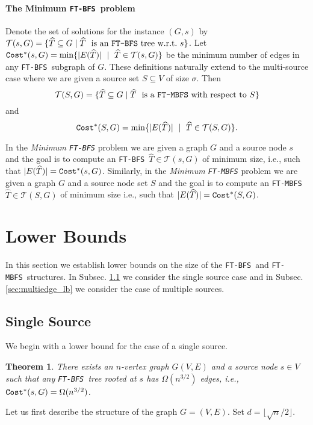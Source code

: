 \documentclass[12pt]{article}
\newtheorem{theorem}{Theorem}[section]
\def\Cost{\mbox{\tt Cost}}
\def\Proof{\par\noindent{\bf Proof:~}}
\def\NSource{\sigma}
\def\FTMBFS{\mbox{\tt FT-MBFS}}
\def\FTBFS{\mbox{\tt FT-BFS}}
\begin{document}
\paragraph{The Minimum \FTBFS\ problem}
Denote the set of solutions for the instance $(G,s)$ by
$\mathcal{T}(s,G)=\{\widehat{T} \subseteq G \mid \widehat{T} \mbox{~~is an \FTBFS\ tree w.r.t.~} s\}$.
Let $\Cost^*(s, G)=\min\{|E(\widehat{T})| ~\mid~\widehat{T} \in \mathcal{T}(s,G)\}$
be the minimum number of edges in any \FTBFS\ subgraph of $G$.
These definitions naturally extend to the multi-source case where we are
given a source set $S \subseteq V$ of size $\NSource$.
Then $$\mathcal{T}(S,G)=\{\widehat{T} \subseteq G \mid \widehat{T} \mbox{~~is a
\FTMBFS\ with respect to~} S\}$$
and $$\Cost^*(S, G)=\min\{|E(\widehat{T})| ~\mid~\widehat{T} \in \mathcal{T}(S,G)\}.$$
\par In the \emph{Minimum \FTBFS} problem we are given a graph $G$ and a
source node $s$ and the goal is to compute an \FTBFS\ $\widehat{T}\in \mathcal{T}(s,G)$
of minimum size, i.e., such that $|E(\widehat{T})|=\Cost^*(s, G)$.
Similarly, in the \emph{Minimum \FTMBFS} problem we are given a graph $G$ and a
source node set $S$ and the goal is to compute an \FTMBFS\
$\widehat{T}\in \mathcal{T}(S,G)$
of minimum size i.e., such that $|E(\widehat{T})|=\Cost^*(S, G)$.

\section{Lower Bounds}
\label{sc:lb}
In this section we establish lower bounds on the size of the \FTBFS\ and
\FTMBFS\ structures.
In Subsec. \ref{sc:lb_single} we consider the single source case and
in Subsec. \ref{sec:multiedge_lb} we consider the case of multiple sources.

\subsection{Single Source}
\label{sc:lb_single}
We begin with a lower bound for the case of a single source.
\begin{theorem}
\label{thm:lowerbound_edgeonef}
There exists an $n$-vertex graph $G(V, E)$ and a source node $s \in V$ such
that any \FTBFS\ tree rooted at $s$ has $\Omega(n^{3/2})$ edges,
i.e., $\Cost^*(s,G)=\Omega(n^{3/2})$.
\end{theorem}
\Proof
Let us first describe the structure of the graph $G=(V,E)$.
Set $d=\lfloor \sqrt{n}/2 \rfloor$.
\end{document}
